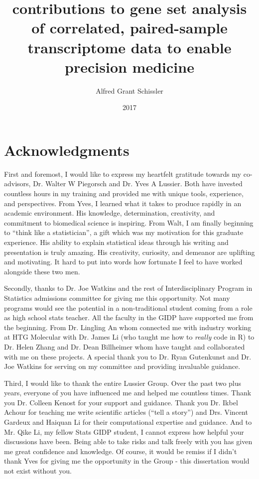 \documentclass[final]{ua-thesis}
\author{Alfred Grant Schissler}
\title{contributions to gene set analysis of correlated, paired-sample transcriptome data to enable precision medicine}
\date{2017}
\numberwithin{equation}{section}
\begin{document}
\maketitle

\chapter*{Acknowledgments}
First and foremost, I would like to express my heartfelt gratitude towards my co-advisors, Dr. Walter W Piegorsch and Dr. Yves A Lussier. Both have invested countless hours in my training and provided me with unique tools, experience, and perspectives. From Yves, I learned what it takes to produce rapidly in an academic environment. His knowledge, determination, creativity, and commitment to biomedical science is inspiring. From Walt, I am finally beginning to ``think like a statistician'', a gift which was my motivation for this graduate experience. His ability to explain statistical ideas through his writing and presentation is truly amazing. His creativity, curiosity, and demeanor are uplifting and motivating. It hard to put into words how fortunate I feel to have worked alongside these two men.

Secondly, thanks to Dr. Joe Watkins and the rest of Interdisciplinary Program in Statistics admissions committee for giving me this opportunity. Not many programs would see the potential in a non-traditional student coming from a role as high school stats teacher. All the faculty in the GIDP have supported me from the beginning. From Dr. Lingling An whom connected me with industry working at HTG Molecular with Dr. James Li (who taught me how to \emph{really} code in R) to Dr. Helen Zhang and Dr. Dean Billheimer whom have taught and collaborated with me on these projects. A special thank you to Dr. Ryan Gutenkunst and Dr. Joe Watkins for serving on my committee and providing invaluable guidance.

Third, I would like to thank the entire Lussier Group. Over the past two plus years, everyone of you have influenced me and helped me countless times. Thank you Dr. Colleen Kenost for your support and guidance. Thank you Dr. Ikbel Achour for teaching me write scientific articles (``tell a story'') and Drs. Vincent Gardeux and Haiquan Li for their computational expertise and guidance. And to Mr. Qike Li, my fellow Stats GIDP student, I cannot express how helpful your discussions have been. Being able to take risks and talk freely with you has given me great confidence and knowledge. Of course, it would be remiss if I didn't thank Yves for giving me the opportunity in the Group - this dissertation would not exist without you.
\end{document}
